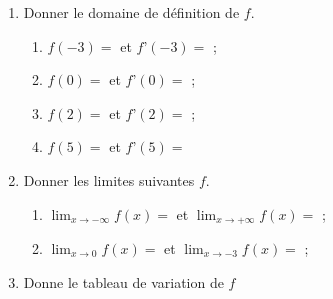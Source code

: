 \documentclass[a4paper,12pt]{article}
\begin{document}
\begin{enumerate}
\item Donner le domaine de définition de $f$.
\begin{enumerate}
\item $f(-3)=$\underline{\hspace{3cm}} et $f’(-3)=$\underline{\hspace{3cm}} ;
\item $f(0)=$\underline{\hspace{3cm}} et $f’(0)=$\underline{\hspace{3cm}} ;
\item $f(2)=$\underline{\hspace{3cm}} et $f’(2)=$\underline{\hspace{3cm}} ;
\item $f(5)=$\underline{\hspace{3cm}} et $f’(5)=$\underline{\hspace{3cm}}
\end{enumerate}
\item Donner les limites suivantes $f$.
\begin{enumerate}
\item $\lim_{x\to -\infty} f(x)=$\underline{\hspace{3cm}} et $\lim_{x\to +\infty} f(x)=$\underline{\hspace{3cm}} ;
\item $\lim_{x\to 0} f(x)=$\underline{\hspace{3cm}} et $\lim_{x\to -3} f(x)=$\underline{\hspace{3cm}} ;
\end{enumerate}
\item Donne le tableau de variation de $f$
\end{enumerate}
\end{document}
